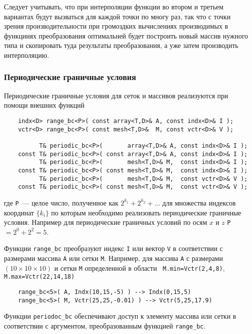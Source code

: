 Следует учитывать, что при интерполяции функции во втором и третьем вариантах
будут вызваться для каждой точки по многу раз, так что с точки зрения
производительности при громоздких вычислениях производимых в функцииях
преобразования оптимальней будет построить новый массив нужного типа и
скопировать туда результаты преобразования, а уже затем производить
интерполяцию.

\subsubsection{Периодические граничные условия}
Периодические граничные условия для сеток и массивов реализуются при помощи
внешних функций
\begin{verbatim}
    indx<D> range_bc<P>( const array<T,D>& A, const indx<D>& I );
    vctr<D> range_bc<P>( const mesh<T,D>&  M, const vctr<D>& V );
  
          T& periodic_bc<P>(       array<T,D>& A, const indx<D>& I );
    const T& periodic_bc<P>( const array<T,D>& A, const indx<D>& I );
          T& periodic_bc<P>(       mesh<T,D>& M,  const indx<D>& I );
    const T& periodic_bc<P>( const mesh<T,D>& M,  const indx<D>& I );
          T& periodic_bc<P>(       mesh<T,D>& M,  const vctr<D>& V );
    const T& periodic_bc<P>( const mesh<T,D>& M,  const vctr<D>& V );
\end{verbatim}
где {\tt P}~--- целое число, полученное как $2^{k_1}+2^{k_2}+...$ для
множества индексов координат $\{k_i\}$ по которым необходимо реализовать
периодические граничные условия. Например для периодические граничных условий
по осям $x$ и $z$ {\tt P}$=2^0+2^2=5$. 


Функции {\tt range\_bc} преобразуют индекс {\tt I} или вектор {\tt V} в
соответствии с размерами массива {\tt A} или сетки {\tt M}.
Например, для массива {\tt A} с размерами
$(10\times 10\times 10)$ и сетки {\tt M} определенной в области {\tt
  M.min=Vctr(2,4,8)}, {\tt M.max=Vctr(22,14,18)} 
\begin{verbatim}
    range_bc<5>( A, Indx(10,15,-5) ) --> Indx(0,15,5)
    range_bc<5>( M, Vctr(25,25,-0.01) ) --> Vctr(5,25,17.9)
\end{verbatim}

Функции {\tt periodoc\_bc} обеспечивают доступ к элементу массива или сетки в
соответствии с аргументом, преобразованным функцией {\tt range\_bc}.

